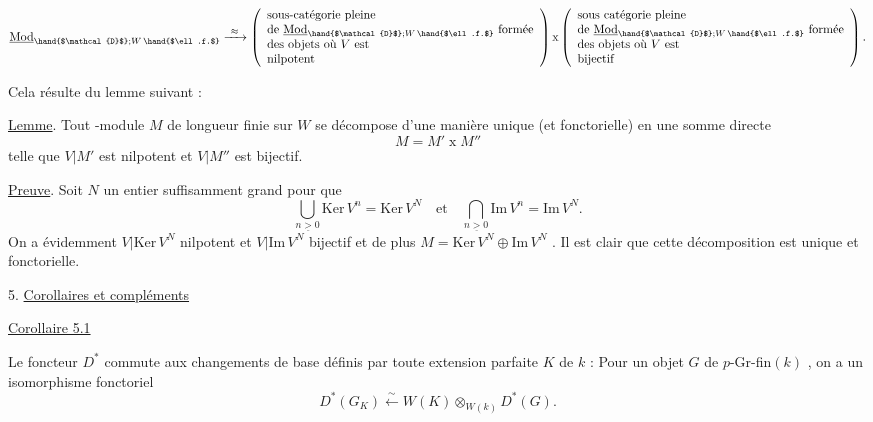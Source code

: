 
\margin{$\times$}
\[
\underline{\mathrm{Mod}}_{\hand{$\mathcal{D}$};W\,\hand{$\ell.f.$}} \xrightarrow{\ \approx\ }
\left(\begin{array}{l}
\text{sous-catégorie pleine}\\
\text{de } \underline{\mathrm{Mod}}_{\hand{$\mathcal{D}$};W\,\hand{$\ell.f.$}} \text{ formée}\\
\text{des objets où } V \text{ est}\\
\text{nilpotent}
\end{array}\right)
\mathrm{x}
\left(\begin{array}{l}
\text{sous catégorie pleine}\\
\text{de } \underline{\mathrm{Mod}}_{\hand{$\mathcal{D}$};W\,\hand{$\ell.f.$}} \text{ formée}\\
\text{des objets où } V \text{ est}\\
\text{bijectif}
\end{array}\right) .
\]

Cela résulte du lemme suivant :

\uline{Lemme}. Tout -module $M$ de longueur finie sur $W$ se décompose d'une
manière unique (et fonctorielle) en une somme directe
\[
M = M' \;\mathrm{x}\; M''
\]
telle que $V|M'$ est nilpotent et $V|M''$ est bijectif.

\uline{Preuve}. Soit $N$ un entier suffisamment grand pour que
\[
\bigcup_{n\underline{>}0} \mathrm{Ker}\, V^{n} = \mathrm{Ker}\, V^{N} \quad \text{et} \quad \bigcap_{n\underline{>}0} \mathrm{Im}\, V^{n} = \mathrm{Im}\, V^{N} .
\]
On a évidemment $V|\mathrm{Ker}\, V^{N}$ nilpotent et $V|\mathrm{Im}\, V^{N}$ bijectif et de plus
$M = \mathrm{Ker}\, V^{N} \oplus \mathrm{Im}\, V^{N}$ . Il est clair que cette décomposition est unique et
fonctorielle.

5. \uline{Corollaires et compléments}

\uline{Corollaire 5.1}

Le foncteur $D^*$ commute aux changements de base définis par
toute extension parfaite $K$ de $k$ : Pour un objet $G$ de $p$-Gr-fin$(k)$ ,
on a un isomorphisme fonctoriel
\[
D^*(G_{K}) \overset{\sim}{\leftarrow} W(K) \otimes_{W(k)} D^*(G) .
\]


